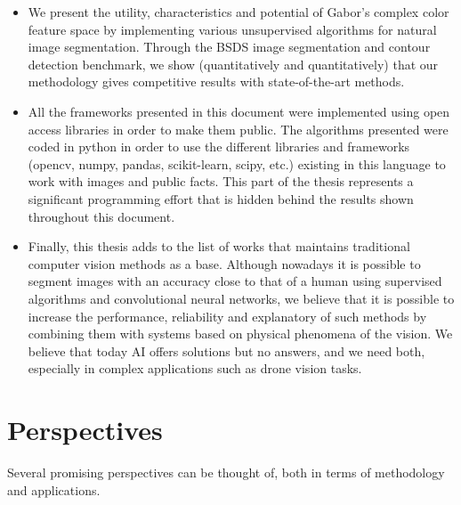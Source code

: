 \begin{itemize}
	\item We present the utility, characteristics and potential of Gabor's complex color feature space by implementing various unsupervised algorithms for natural image segmentation. Through the BSDS image segmentation and contour detection benchmark, we show (quantitatively and quantitatively) that our methodology gives competitive results with state-of-the-art methods.
	\item All the frameworks presented in this document were implemented using open access libraries in order to make them public. The algorithms presented were coded in python in order to use the different libraries and frameworks (opencv, numpy, pandas, scikit-learn, scipy, etc.) existing in this language to work with images and public facts. This part of the thesis represents a significant programming effort that is hidden behind the results shown throughout this document.
	\item Finally, this thesis adds to the list of works that maintains traditional computer vision methods as a base. Although nowadays it is possible to segment images with an accuracy close to that of a human using supervised algorithms and convolutional neural networks, we believe that it is possible to increase the performance, reliability and explanatory of such methods by combining them with systems based on physical phenomena of the vision. We believe that today AI offers solutions but no answers, and we need both, especially in complex applications such as drone vision tasks. 
\end{itemize}


\section{Perspectives}
Several promising perspectives can be thought of, both in terms of methodology and applications.


